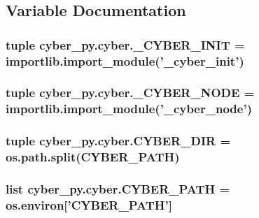 \subsection{Variable Documentation}
\hypertarget{namespacecyber__py_1_1cyber_a21aad6bb1a9e36085a1080ee9ef1de44}{
\subsubsection[{\-\_\-\-C\-Y\-B\-E\-R\-\_\-\-I\-N\-I\-T}]{\setlength{\rightskip}{0pt plus 5cm}tuple cyber\-\_\-py.\-cyber.\-\_\-\-C\-Y\-B\-E\-R\-\_\-\-I\-N\-I\-T = importlib.\-import\-\_\-module('\-\_\-cyber\-\_\-init')}}\label{namespacecyber__py_1_1cyber_a21aad6bb1a9e36085a1080ee9ef1de44}
\hypertarget{namespacecyber__py_1_1cyber_aebfa8caeeb1ae0bf47733f9c2a184f93}{
\subsubsection[{\-\_\-\-C\-Y\-B\-E\-R\-\_\-\-N\-O\-D\-E}]{\setlength{\rightskip}{0pt plus 5cm}tuple cyber\-\_\-py.\-cyber.\-\_\-\-C\-Y\-B\-E\-R\-\_\-\-N\-O\-D\-E = importlib.\-import\-\_\-module('\-\_\-cyber\-\_\-node')}}\label{namespacecyber__py_1_1cyber_aebfa8caeeb1ae0bf47733f9c2a184f93}
\hypertarget{namespacecyber__py_1_1cyber_a9ad5920bb49c68afc605b57816eda7d8}{
\subsubsection[{C\-Y\-B\-E\-R\-\_\-\-D\-I\-R}]{\setlength{\rightskip}{0pt plus 5cm}tuple cyber\-\_\-py.\-cyber.\-C\-Y\-B\-E\-R\-\_\-\-D\-I\-R = os.\-path.\-split({\bf C\-Y\-B\-E\-R\-\_\-\-P\-A\-T\-H})}}\label{namespacecyber__py_1_1cyber_a9ad5920bb49c68afc605b57816eda7d8}
\hypertarget{namespacecyber__py_1_1cyber_a512e2d9892caf9598327c8238f9099a7}{
\subsubsection[{C\-Y\-B\-E\-R\-\_\-\-P\-A\-T\-H}]{\setlength{\rightskip}{0pt plus 5cm}list cyber\-\_\-py.\-cyber.\-C\-Y\-B\-E\-R\-\_\-\-P\-A\-T\-H = os.\-environ\mbox{[}'C\-Y\-B\-E\-R\-\_\-\-P\-A\-T\-H'\mbox{]}}}\label{namespacecyber__py_1_1cyber_a512e2d9892caf9598327c8238f9099a7}
